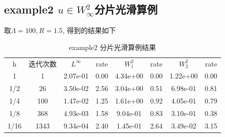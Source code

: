 \documentclass[11pt]{article}
\begin{document}
\clearpage


\subsection{example2 $u\in W_\infty^2$分片光滑算例}
取$\Lambda=100,R=1.5$, 得到的结果如下
\begin{table}[ht!]
\centering
\caption{example2 分片光滑算例结果}
\label{table}
    \begin{tabular}{  c| c|c c|c c| c c }
          \hline      
  \hline
  
\hline



    \hline     
  
  
\hline



    \hline     
    \hline   
    
 h  &迭代次数  	&$L^\infty{}$& rate&$W_1^2$&rate&$W_2^2$&rate\\

1&1&2.07e-01	&0.00	&4.34e+00	&0.00	&1.22e+00	&0.00\\
1/2&26&3.50e-02	&2.56	&3.04e+00	&0.51	&6.98e-01	&0.81\\
1/4&100&1.47e-02	&1.25	&1.61e+00	&0.92	&4.05e-01	&0.79\\
1/8&368&4.93e-03	&1.58	&9.04e-01	&0.83	&3.10e-01	&0.38\\
1/16&1343&9.34e-04	&2.40	&1.45e-01	&2.64	&3.49e-02	&3.15\\
      \hline      
  \hline
  
\hline



    \hline     
    \hline
 
  \hline
  
\hline


    \end{tabular}
\end{table}
\end{document}
